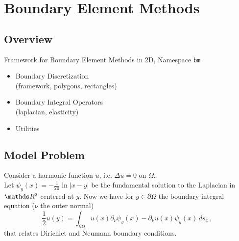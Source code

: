 







\chapter {Boundary Element Methods}

\section {Overview}

Framework for Boundary Element Methods in 2D, Namespace \lstinline$bm$

\begin {itemize}
\item Boundary Discretization\\
(framework, polygons, rectangles)
\item Boundary Integral Operators\\
(laplacian, elasticity)
\item Utilities
\end {itemize}

\section {Model Problem}

Consider a harmonic function $u$, i.e. $\Delta u = 0$ on $\Omega$.\\
Let $\psi_y (x) = -\frac{1}{2\pi }\ln \left| x-y\right|$ be the fundamental solution to the Laplacian in $\R^2$ centered at $y$.
Now we have for $y \in \partial \Omega$ the boundary integral equation ($\nu$ the outer normal)
\[ \frac {1}{2} u(y) = \int_{\partial \Omega} u(x) \partial_\nu \psi_y (x) - \partial_\nu u(x) \psi_y(x) \, ds_x \,, \]
that relates Dirichlet and Neumann boundary conditions.

